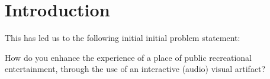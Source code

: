 \chapter{Introduction}


This has led us to the following initial initial problem statement:

How do you enhance the experience of a place of public recreational entertainment, through the use of an interactive (audio) visual artifact?




